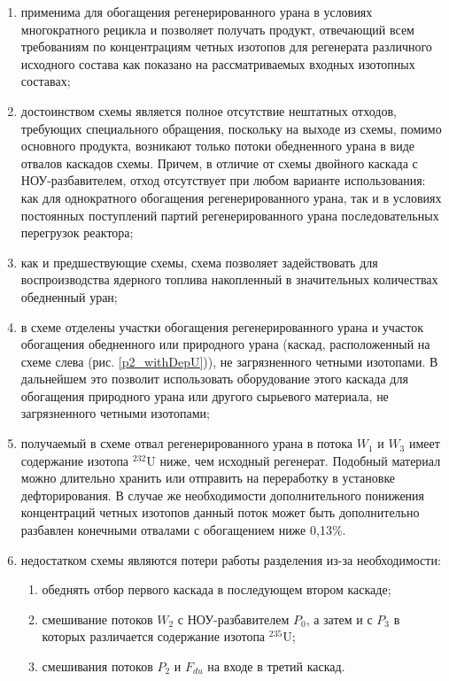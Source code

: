 \begin{enumerate}
    \item применима для обогащения регенерированного урана в условиях многократного рецикла и позволяет получать продукт, отвечающий всем требованиям по концентрациям четных изотопов для регенерата различного исходного состава как показано на рассматриваемых входных изотопных составах;
    \item достоинством схемы является полное отсутствие нештатных отходов, требующих специального обращения, поскольку на выходе из схемы, помимо основного продукта, возникают только потоки обедненного урана в виде отвалов каскадов схемы. Причем, в отличие от схемы двойного каскада с НОУ-разбавителем, отход отсутствует при любом варианте использования: как для однократного обогащения регенерированного урана, так и в условиях постоянных поступлений партий регенерированного урана последовательных перегрузок реактора;
    \item как и предшествующие схемы, схема позволяет задействовать для воспроизводства ядерного топлива накопленный в значительных количествах обедненный уран;
    \item в схеме отделены участки обогащения регенерированного урана и участок обогащения обедненного или природного урана (каскад, расположенный на схеме слева (рис. \ref{p2_withDepU})), не загрязненного четными изотопами. В дальнейшем это позволит использовать оборудование этого каскада для обогащения природного урана или другого сырьевого материала, не загрязненного четными изотопами;
    \item получаемый в схеме отвал регенерированного урана в потока $W_1$ и $W_3$ имеет содержание изотопа $^{232}$U ниже, чем исходный регенерат. Подобный материал можно длительно хранить или отправить на переработку в установке дефторирования. В случае же необходимости дополнительного понижения концентраций четных изотопов данный поток может быть дополнительно разбавлен конечными отвалами с обогащением ниже 0,13\%. 
    \item недостатком схемы являются потери работы разделения из-за необходимости:
    \begin{enumerate}
        \item обеднять отбор первого каскада в последующем втором каскаде;
        \item смешивание потоков $W_2$ с НОУ-разбавителем $P_0$, а затем и с $P_3$ в которых различается содержание изотопа $^{235}$U;
        \item смешивания потоков $P_2$ и $F_{du}$ на входе в третий каскад.
    \end{enumerate}
\end{enumerate}

